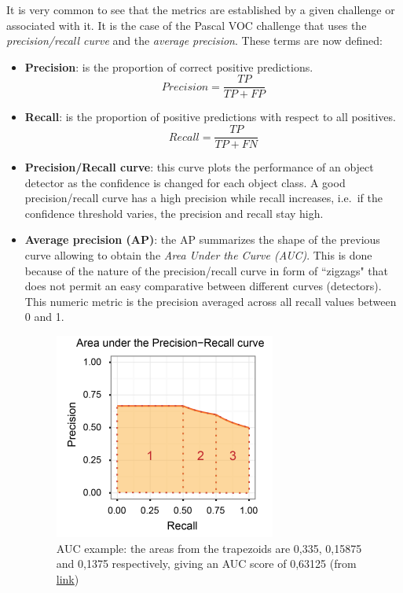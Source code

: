 It is very common to see that the metrics are established by a given challenge or associated with it. It is the case of the Pascal VOC challenge that uses the \textit{precision/recall curve} and the \textit{average precision}. These terms are now defined:
\begin{itemize}
    \item \textbf{Precision}: is the proportion of correct positive predictions.
    \begin{equation}
        Precision = \frac{TP}{TP + FP}
    \end{equation}
    \item \textbf{Recall}: is the proportion of positive predictions with respect to all positives.
    \begin{equation}
        Recall = \frac{TP}{TP + FN}
    \end{equation}
    \item \textbf{Precision/Recall curve}: this curve plots the performance of an object detector as the confidence is changed for each object class. A good precision/recall curve has a high precision while recall increases, i.e.\ if the confidence threshold varies, the precision and recall stay high.
    \item \textbf{Average precision (AP)}: the AP summarizes the shape of the previous curve allowing to obtain the \textit{Area Under the Curve (AUC)}. This is done because of the nature of the precision/recall curve in form of ``zigzags"  that does not permit an easy comparative between different curves (detectors). This numeric metric is the precision averaged across all recall values between 0 and 1.
    \begin{figure}[H]
    \begin{center}
    \includegraphics[scale=0.6]{figures/auc.png}
    \caption{AUC example: the areas from the trapezoids are 0,335, 0,15875 and 0,1375 respectively, giving an AUC score of 0,63125 (from \href{https://classeval.wordpress.com/introduction/introduction-to-the-precision-recall-plot/}{link})}

\end{center}
\end{figure}
\end{itemize}
